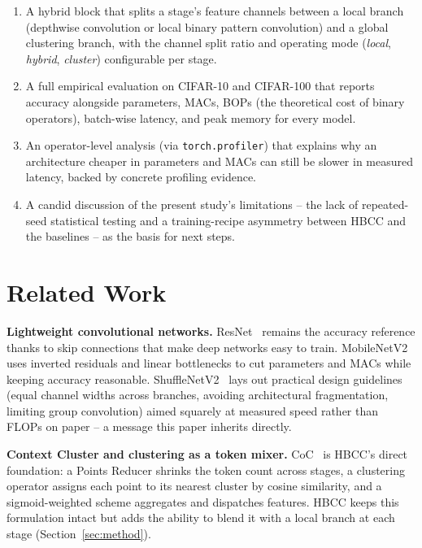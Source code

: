 \documentclass[journal]{IEEEtran}
\begin{document}
\begin{enumerate}
    \item A hybrid block that splits a stage's feature channels between a local branch (depthwise convolution or local binary pattern convolution) and a global clustering branch, with the channel split ratio and operating mode (\textit{local}, \textit{hybrid}, \textit{cluster}) configurable per stage.
    \item A full empirical evaluation on CIFAR-10 and CIFAR-100 that reports accuracy alongside parameters, MACs, BOPs (the theoretical cost of binary operators), batch-wise latency, and peak memory for every model.
    \item An operator-level analysis (via \texttt{torch.profiler}) that explains why an architecture cheaper in parameters and MACs can still be slower in measured latency, backed by concrete profiling evidence.
    \item A candid discussion of the present study's limitations -- the lack of repeated-seed statistical testing and a training-recipe asymmetry between HBCC and the baselines -- as the basis for next steps.
\end{enumerate}

\section{Related Work}

\textbf{Lightweight convolutional networks.} ResNet~\cite{He2016ResNet} remains the accuracy reference thanks to skip connections that make deep networks easy to train. MobileNetV2~\cite{Sandler2018MobileNetV2} uses inverted residuals and linear bottlenecks to cut parameters and MACs while keeping accuracy reasonable. ShuffleNetV2~\cite{Ma2018ShuffleNetV2} lays out practical design guidelines (equal channel widths across branches, avoiding architectural fragmentation, limiting group convolution) aimed squarely at measured speed rather than FLOPs on paper -- a message this paper inherits directly.

\textbf{Context Cluster and clustering as a token mixer.} CoC~\cite{Ma2023ImageAsSetOfPoints} is HBCC's direct foundation: a Points Reducer shrinks the token count across stages, a clustering operator assigns each point to its nearest cluster by cosine similarity, and a sigmoid-weighted scheme aggregates and dispatches features. HBCC keeps this formulation intact but adds the ability to blend it with a local branch at each stage (Section~\ref{sec:method}).
\end{document}
